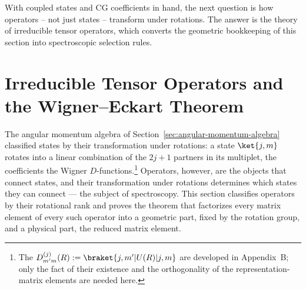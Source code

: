 With coupled states and CG coefficients in hand, the next question is how operators -- not just states -- transform under rotations. The answer is the theory of irreducible tensor operators, which converts the geometric bookkeeping of this section into spectroscopic selection rules.

\section{Irreducible Tensor Operators and the Wigner--Eckart Theorem}
\label{sec:irreducible-tensor-operators}

The angular momentum algebra of Section~\ref{sec:angular-momentum-algebra} classified states by their transformation under rotations: a state $\ket{j,m}$ rotates into a linear combination of the $2j+1$ partners in its multiplet, the coefficients the Wigner $D$-functions.\footnote{The $D^{(j)}_{m'm}(R) := \braket{j,m'|U(R)|j,m}$ are developed in Appendix~B; only the fact of their existence and the orthogonality of the representation-matrix elements are needed here.} Operators, however, are the objects that connect states, and their transformation under rotations determines which states they can connect --- the subject of spectroscopy. This section classifies operators by their rotational rank and proves the theorem that factorizes every matrix element of every such operator into a geometric part, fixed by the rotation group, and a physical part, the reduced matrix element.

